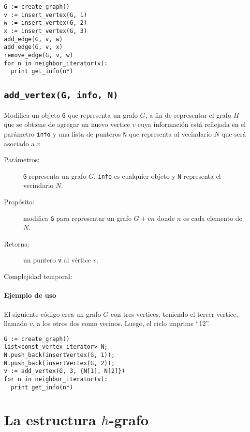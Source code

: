 \documentclass[a4paper,12pt]{article}
\begin{document}
\begin{lstlisting}
G := create_graph()
v := insert_vertex(G, 1)
w := insert_vertex(G, 2)
x := insert_vertex(G, 3)
add_edge(G, v, w)
add_edge(G, v, x)
remove_edge(G, v, w)
for n in neighbor_iterator(v):
  print get_info(n*)
\end{lstlisting}


\subsection{\texttt{add\_vertex(G, info, N)}}
\label{sec:tad grafo:add-vertex}

Modifica un objeto \texttt{G} que representa un grafo $G$, a fin de representar el grafo $H$ que se obtiene de agregar un nuevo vertice $v$ cuya información está reflejada en el parámetro \texttt{info} y una lista de punteros \texttt{N} que representa al vecindario $N$ que será asociado a $v$

\begin{description}
  \item [Parámetros:] \texttt{G} representa un grafo $G$, \texttt{info} es cualquier objeto y \texttt{N} representa el vecindario $N$.
  \item [Propósito:] modifica \texttt{G} para representar un grafo $G + vn$ donde $n$ es cada elemento de $N$.
  \item [Retorna:] un puntero \texttt{v} al vértice $v$.
  \item [Complejidad temporal:]
\end{description}

\paragraph{Ejemplo de uso}

El siguiente código crea un grafo $G$ con tres vertices, teniendo el tercer vertice, llamado $v$, a los otros dos como vecinos. Luego, el ciclo imprime ``12''.

\begin{lstlisting}
G := create_graph()
list<const_vertex_iterator> N;
N.push_back(insertVertex(G, 1));
N.push_back(insertVertex(G, 2));
v := add_vertex(G, 3, {N[1], N[2]})
for n in neighbor_iterator(v):
  print get_info(n*)
\end{lstlisting}




\section{La estructura $h$-grafo}
\label{sec:h-grafo}
\end{document}
